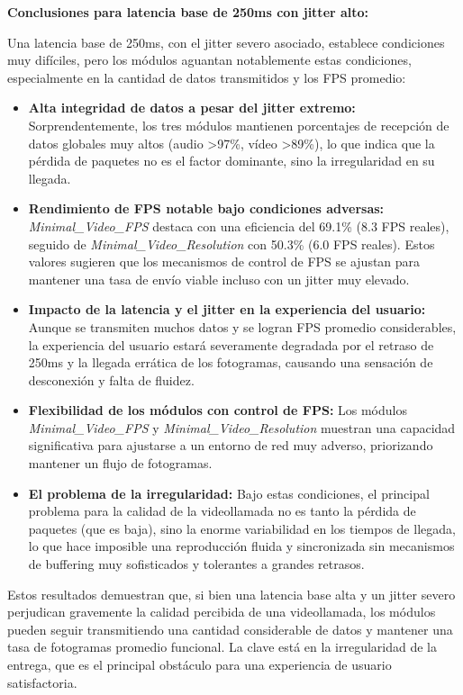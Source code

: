 \vspace{\baselineskip}

\textbf{Conclusiones para latencia base de 250ms con jitter alto:}

Una latencia base de 250ms, con el jitter severo asociado, establece condiciones muy difíciles, pero los módulos aguantan notablemente estas condiciones, especialmente en la cantidad de datos transmitidos y los FPS promedio:

\begin{itemize}
\item \textbf{Alta integridad de datos a pesar del jitter extremo:} Sorprendentemente, los tres módulos mantienen porcentajes de recepción de datos globales muy altos (audio >97\%, vídeo >89\%), lo que indica que la pérdida de paquetes no es el factor dominante, sino la irregularidad en su llegada.
\item \textbf{Rendimiento de FPS notable bajo condiciones adversas:} \textit{Minimal\_Video\_FPS} destaca con una eficiencia del 69.1\% (8.3 FPS reales), seguido de \textit{Minimal\_Video\_Resolution} con 50.3\% (6.0 FPS reales). Estos valores sugieren que los mecanismos de control de FPS se ajustan para mantener una tasa de envío viable incluso con un jitter muy elevado.
\item \textbf{Impacto de la latencia y el jitter en la experiencia del usuario:} Aunque se transmiten muchos datos y se logran FPS promedio considerables, la experiencia del usuario estará severamente degradada por el retraso de 250ms y la llegada errática de los fotogramas, causando una sensación de desconexión y falta de fluidez.
\item \textbf{Flexibilidad de los módulos con control de FPS:} Los módulos \textit{Minimal\_Video\_FPS} y \textit{Minimal\_Video\_Resolution} muestran una capacidad significativa para ajustarse a un entorno de red muy adverso, priorizando mantener un flujo de fotogramas.
\item \textbf{El problema de la irregularidad:} Bajo estas condiciones, el principal problema para la calidad de la videollamada no es tanto la pérdida de paquetes (que es baja), sino la enorme variabilidad en los tiempos de llegada, lo que hace imposible una reproducción fluida y sincronizada sin mecanismos de buffering muy sofisticados y tolerantes a grandes retrasos.
\end{itemize}

Estos resultados demuestran que, si bien una latencia base alta y un jitter severo perjudican gravemente la calidad percibida de una videollamada, los módulos pueden seguir transmitiendo una cantidad considerable de datos y mantener una tasa de fotogramas promedio funcional. La clave está en la irregularidad de la entrega, que es el principal obstáculo para una experiencia de usuario satisfactoria.
\newpage

